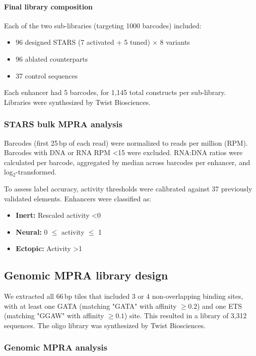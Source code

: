 \paragraph{Final library composition}
Each of the two sub-libraries (targeting 1000 barcodes) included:
\begin{itemize}
  \item 96 designed STARS (7 activated + 5 tuned) \(\times\) 8 variants
  \item 96 ablated counterparts
  \item 37 control sequences
\end{itemize}

Each enhancer had 5 barcodes, for 1,145 total constructs per sub-library. Libraries were synthesized by Twist Biosciences.

\subsubsection{STARS bulk MPRA analysis}
Barcodes (first 25\,bp of each read) were normalized to reads per million (RPM). Barcodes with DNA or RNA RPM \textless 15 were excluded. RNA:DNA ratios were calculated per barcode, aggregated by median across barcodes per enhancer, and log$_2$-transformed.

To assess label accuracy, activity thresholds were calibrated against 37 previously validated elements. Enhancers were classified as:
\begin{itemize}
  \item \textbf{Inert:} Rescaled activity \textless 0
  \item \textbf{Neural:} 0 \(\leq\) activity \(\leq\) 1
  \item \textbf{Ectopic:} Activity \textgreater 1
\end{itemize}

\subsection{Genomic MPRA library design}
We extracted all 66\,bp tiles that included 3 or 4 non-overlapping binding sites, with at least one GATA (matching "GATA" with affinity \(\geq 0.2\)) and one ETS (matching "GGAW" with affinity \(\geq 0.1\)) site. This resulted in a library of 3,312 sequences. The oligo library was synthesized by Twist Biosciences.

\subsubsection{Genomic MPRA analysis}
